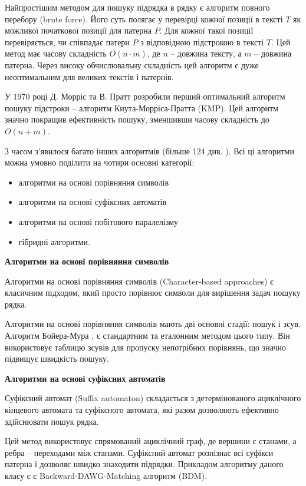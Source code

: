 \documentclass[a4paper,14pt]{extarticle} %
\begin{document}
	Найпростішим методом для пошуку підрядка в рядку є алгоритм повного перебору (brute force). Його суть полягає у перевірці кожної позиції в тексті \( T \) як можливої початкової позиції для патерна \( P \). Для кожної такої позиції перевіряється, чи співпадає патерн \( P \) з відповідною підстрокою в тексті \( T \). Цей метод має часову складність \( O(n \cdot m) \), де \( n \) – довжина тексту, а \( m \) – довжина патерна. Через високу обчислювальну складність цей алгоритм є дуже неоптимальним для великих текстів і патернів.

	У 1970 році Д. Морріс та В. Пратт \cite{morris-pratt} розробили перший оптимальний алгоритм пошуку підстроки – алгоритм Кнута-Морріса-Пратта (KMP). Цей алгоритм значно покращив ефективність пошуку, зменшивши часову складність до \( O(n + m) \).

	З часом з'явилося багато інших алгоритмів (більше 124 див. \cite{smart}). Всі ці алгоритми можна умовно поділити на чотири основні категорії:
	\begin{itemize}
		\item алгоритми на основі порівняння символів
		\item  алгоритми на основі суфіксних автоматів
		\item алгоритми на основі побітового паралелізму
		\item гібридні алгоритми.
	\end{itemize}

\textbf{Алгоритми на основі порівняння символів}

Алгоритми на основі порівняння символів (Character-based approaches) є класичним підходом, який просто порівнює символи для вирішення задач пошуку рядка.

Алгоритми на основі порівняння символів мають дві основні стадії: пошук і зсув. Алгоритм Бойера-Мура \cite{bm}, є стандартним та еталонним методом цього типу. Він використовує таблицю зсувів для пропуску непотрібних порівнянь, що значно підвищує швидкість пошуку.

\textbf{Алгоритми на основі суфіксних автоматів}

Суфіксний автомат (Suffix automaton) складається з детермінованого ациклічного кінцевого автомата та суфіксного автомата, які разом дозволяють ефективно здійснювати пошук рядка.

Цей метод використовує спрямований ациклічний граф, де вершини є станами, а ребра – переходами між станами. Суфіксний автомат розпізнає всі суфікси патерна і дозволяє швидко знаходити підрядки.
Прикладом алгоритму даного класу є є Backward-DAWG-Matching алгоритм (BDM).
\end{document}

